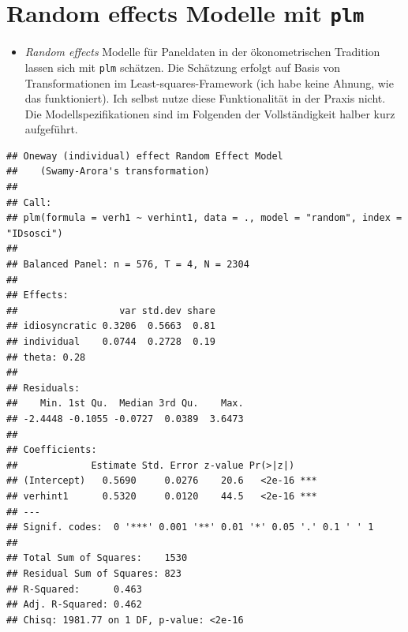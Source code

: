 \documentclass[
]{book}
\newenvironment{Shaded}{\begin{snugshade}}{\end{snugshade}}
\newcommand{\CommentTok}[1]{\textcolor[rgb]{0.56,0.35,0.01}{\textit{#1}}}
\newcommand{\DataTypeTok}[1]{\textcolor[rgb]{0.13,0.29,0.53}{#1}}
\newcommand{\KeywordTok}[1]{\textcolor[rgb]{0.13,0.29,0.53}{\textbf{#1}}}
\newcommand{\NormalTok}[1]{#1}
\newcommand{\OperatorTok}[1]{\textcolor[rgb]{0.81,0.36,0.00}{\textbf{#1}}}
\newcommand{\StringTok}[1]{\textcolor[rgb]{0.31,0.60,0.02}{#1}}
\providecommand{\tightlist}{%
  \setlength{\itemsep}{0pt}\setlength{\parskip}{0pt}}
\begin{document}
\hypertarget{random-effects-modelle-mit-plm}{%
\section{\texorpdfstring{Random effects Modelle mit \texttt{plm}}{Random effects Modelle mit plm}}\label{random-effects-modelle-mit-plm}}

\begin{itemize}
\tightlist
\item
  \emph{Random effects} Modelle für Paneldaten in der ökonometrischen Tradition lassen sich mit \texttt{plm} schätzen. Die Schätzung erfolgt auf Basis von Transformationen im Least-squares-Framework (ich habe keine Ahnung, wie das funktioniert). Ich selbst nutze diese Funktionalität in der Praxis nicht. Die Modellspezifikationen sind im Folgenden der Vollständigkeit halber kurz aufgeführt.
\end{itemize}

\begin{Shaded}
\end{Shaded}

\begin{verbatim}
## Oneway (individual) effect Random Effect Model 
##    (Swamy-Arora's transformation)
## 
## Call:
## plm(formula = verh1 ~ verhint1, data = ., model = "random", index = "IDsosci")
## 
## Balanced Panel: n = 576, T = 4, N = 2304
## 
## Effects:
##                  var std.dev share
## idiosyncratic 0.3206  0.5663  0.81
## individual    0.0744  0.2728  0.19
## theta: 0.28
## 
## Residuals:
##    Min. 1st Qu.  Median 3rd Qu.    Max. 
## -2.4448 -0.1055 -0.0727  0.0389  3.6473 
## 
## Coefficients:
##             Estimate Std. Error z-value Pr(>|z|)    
## (Intercept)   0.5690     0.0276    20.6   <2e-16 ***
## verhint1      0.5320     0.0120    44.5   <2e-16 ***
## ---
## Signif. codes:  0 '***' 0.001 '**' 0.01 '*' 0.05 '.' 0.1 ' ' 1
## 
## Total Sum of Squares:    1530
## Residual Sum of Squares: 823
## R-Squared:      0.463
## Adj. R-Squared: 0.462
## Chisq: 1981.77 on 1 DF, p-value: <2e-16
\end{verbatim}
\end{document}
